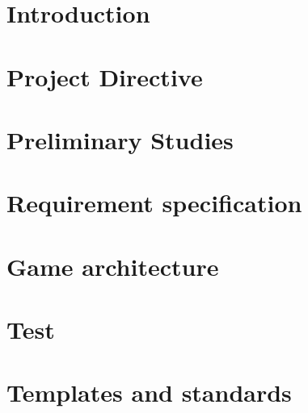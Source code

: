 \documentclass[11pt, a4paper]{article}
\begin{document}


%
\newpage
\tableofcontents
\newpage
{}

\section{Introduction}




\newpage
\section{Project Directive}






\newpage
\section{Preliminary Studies}






\newpage
\section{Requirement specification}





\newpage
\section{Game architecture}
\newpage
\section{Test}

\newpage

\newpage

\newpage

\newpage


\newpage
\section{Templates and standards}


\end{document}
